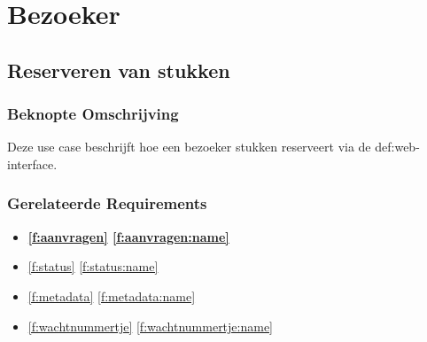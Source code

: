 \documentclass[a4paper,titlepage]{report}
\makeatletter
\def\namedlabel#1#2{
  \label{#1}
  \begingroup
   \def\@currentlabel{#2}%
   \label{#1:name}\endgroup
}
\def\namedref#1{\ref{#1} \ref{#1:name}}
\makeatother
\begin{document}

  \section{Bezoeker}
    \subsection{Reserveren van stukken}
    \namedlabel{u:reserveer}{Reserveren van stukken}
      \subsubsection{Beknopte Omschrijving}
        Deze use case beschrijft hoe een bezoeker stukken reserveert
        via de \gls{def:web-interface}.
      \subsubsection{Gerelateerde Requirements}
        \begin{itemize}
          \item \textbf{\namedref{f:aanvragen}}
          \item \namedref{f:status}
          \item \namedref{f:metadata}
          \item \namedref{f:wachtnummertje}
        \end{itemize}
\end{document}
